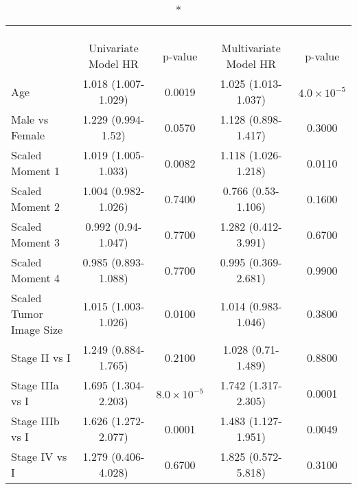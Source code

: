 \captionsetup[table]{labelformat=empty,skip=1pt}
\begin{longtable}{lcccc}
\caption*{
\large Cox Proportional Hazard Model\\ 
\small \\ 
} \\ 
\toprule
 & Univariate Model HR & p-value & Multivariate Model HR & p-value \\ 
\midrule
Age & 1.018 (1.007-1.029) & 0.0019 & 1.025 (1.013-1.037) & $4.0 \times 10^{-5}$ \\ 
Male vs Female & 1.229 (0.994-1.52) & 0.0570 & 1.128 (0.898-1.417) & 0.3000 \\ 
Scaled Moment 1 & 1.019 (1.005-1.033) & 0.0082 & 1.118 (1.026-1.218) & 0.0110 \\ 
Scaled Moment 2 & 1.004 (0.982-1.026) & 0.7400 & 0.766 (0.53-1.106) & 0.1600 \\ 
Scaled Moment 3 & 0.992 (0.94-1.047) & 0.7700 & 1.282 (0.412-3.991) & 0.6700 \\ 
Scaled Moment 4 & 0.985 (0.893-1.088) & 0.7700 & 0.995 (0.369-2.681) & 0.9900 \\ 
Scaled Tumor Image Size & 1.015 (1.003-1.026) & 0.0100 & 1.014 (0.983-1.046) & 0.3800 \\ 
Stage II vs I & 1.249 (0.884-1.765) & 0.2100 & 1.028 (0.71-1.489) & 0.8800 \\ 
Stage IIIa vs I & 1.695 (1.304-2.203) & $8.0 \times 10^{-5}$ & 1.742 (1.317-2.305) & 0.0001 \\ 
Stage IIIb vs I & 1.626 (1.272-2.077) & 0.0001 & 1.483 (1.127-1.951) & 0.0049 \\ 
Stage IV vs I & 1.279 (0.406-4.028) & 0.6700 & 1.825 (0.572-5.818) & 0.3100 \\ 
\bottomrule
\end{longtable}

